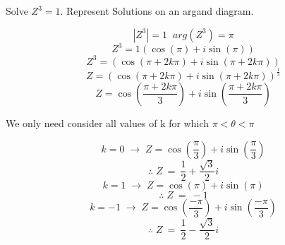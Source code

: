 \documentclass{article}
\begin{document}
Solve \(Z^3=1\). Represent Solutions on an argand diagram.

\[|Z^3|=1 \;\; arg(Z^3)=\pi\]
\[Z^3=1\left(\cos\left(\pi\right)+i\sin\left(\pi\right)\right)\]
\[Z^3=\left(\cos\left(\pi+2k\pi\right)+i\sin\left(\pi+2k\pi\right)\right)\]
\[Z=\left(\cos\left(\pi+2k\pi\right)+i\sin\left(\pi+2k\pi\right)\right)^{\frac{1}{3}}\]
\[Z=\cos\left(\frac{\pi+2k\pi}{3}\right)+i\sin\left(\frac{\pi+2k\pi}{3}\right)\]

\noindent We only need consider all values of k for which \(\pi<\theta<\pi\)

\[k=0 \;\rightarrow\; Z=\cos\left(\frac{\pi}{3}\right)+i\sin\left(\frac{\pi}{3}\right)\]
\[\therefore \; Z \:=\: \frac{1}{2}+\frac{\sqrt{3}}{2}i\]
\[k=1 \;\rightarrow\; Z=\cos\left(\pi\right)+i\sin\left(\pi\right)\]
\[\therefore \; Z \:=\: -1\]
\[k=-1 \;\rightarrow\; Z=\cos\left(\frac{-\pi}{3}\right)+i\sin\left(\frac{-\pi}{3}\right)\]
\[\therefore \; Z \:=\: \frac{1}{2}-\frac{\sqrt{3}}{2}i\]

\begin{center}
\end{center}
\end{document}
